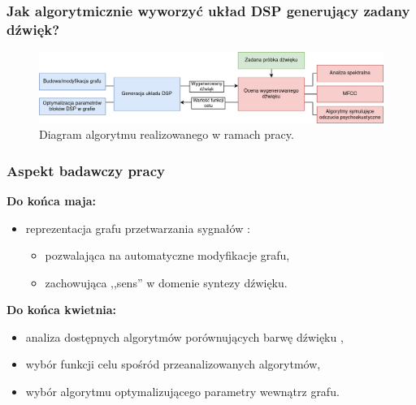 \documentclass[]{beamer}
\begin{document}
\begin{frame}
  \frametitle{Jak algorytmicznie wyworzyć układ DSP generujący zadany dźwięk?}

  \begin{figure}
    \centering
    \includegraphics[width=1.0\linewidth]{algorithm-diagram.png}
    \caption{Diagram algorytmu realizowanego w ramach pracy.}
  \end{figure}
\end{frame}


\begin{frame}
  \frametitle{Aspekt badawczy pracy}
  
  \textbf{Do końca maja:}
  \begin{itemize}
    \item reprezentacja grafu przetwarzania sygnałów \cite{puredata}:
      \begin{itemize}
        \item pozwalająca na automatyczne modyfikacje grafu,
        \item zachowująca ,,sens'' w domenie syntezy dźwięku.
      \end{itemize}
  \end{itemize}

  \textbf{Do końca kwietnia:}
  \begin{itemize}
    \item analiza dostępnych algorytmów porównujących barwę dźwięku \cite{music_identification} \cite{sliding_fourier} \cite{ddx7},
    \item wybór funkcji celu spośród przeanalizowanych algorytmów,
    \item wybór algorytmu optymalizującego parametry wewnątrz grafu.
  \end{itemize}

\end{frame}
\end{document}
